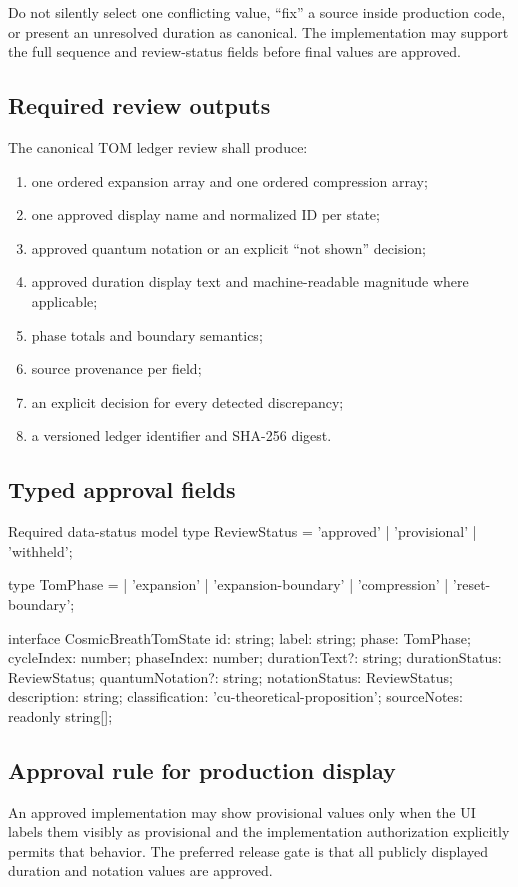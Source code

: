 \documentclass[11pt,letterpaper]{article}
\begin{document}
\begin{warningbox}
Do not silently select one conflicting value, ``fix'' a source inside production code, or present an unresolved duration as canonical. The implementation may support the full sequence and review-status fields before final values are approved.
\end{warningbox}

\subsection{Required review outputs}
The canonical TOM ledger review shall produce:
\begin{enumerate}
\item one ordered expansion array and one ordered compression array;
\item one approved display name and normalized ID per state;
\item approved quantum notation or an explicit ``not shown'' decision;
\item approved duration display text and machine-readable magnitude where applicable;
\item phase totals and boundary semantics;
\item source provenance per field;
\item an explicit decision for every detected discrepancy;
\item a versioned ledger identifier and SHA-256 digest.
\end{enumerate}

\subsection{Typed approval fields}
\begin{codebox}{Required data-status model}
type ReviewStatus = 'approved' | 'provisional' | 'withheld';

type TomPhase =
  | 'expansion'
  | 'expansion-boundary'
  | 'compression'
  | 'reset-boundary';

interface CosmicBreathTomState {
  id: string;
  label: string;
  phase: TomPhase;
  cycleIndex: number;
  phaseIndex: number;
  durationText?: string;
  durationStatus: ReviewStatus;
  quantumNotation?: string;
  notationStatus: ReviewStatus;
  description: string;
  classification: 'cu-theoretical-proposition';
  sourceNotes: readonly string[];
}
\end{codebox}

\subsection{Approval rule for production display}
An approved implementation may show provisional values only when the UI labels them visibly as provisional and the implementation authorization explicitly permits that behavior. The preferred release gate is that all publicly displayed duration and notation values are approved.
\end{document}
